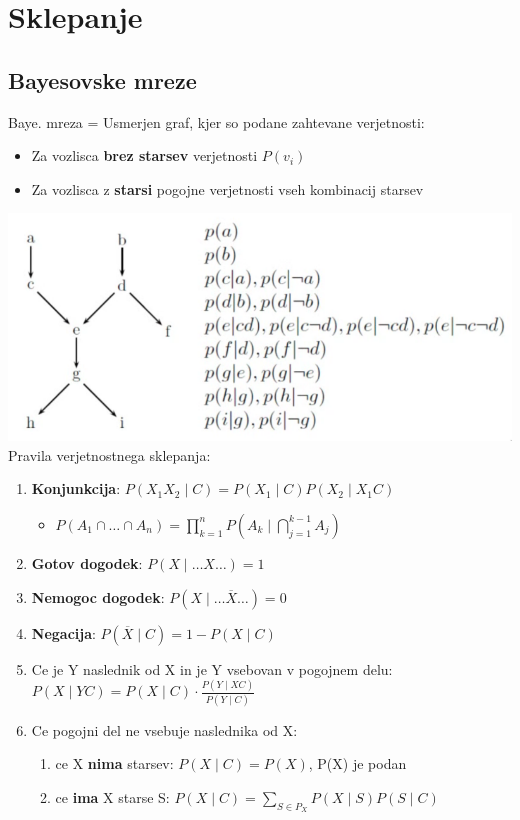 \section{Sklepanje}
\subsection{Bayesovske mreze}
Baye. mreza = Usmerjen graf, kjer so podane zahtevane verjetnosti:
\begin{itemize}[leftmargin=*,topsep=0pt,noitemsep]
    \item Za vozlisca \textbf{brez starsev} verjetnosti $P(v_i)$
    \item Za vozlisca z \textbf{starsi} pogojne verjetnosti vseh kombinacij starsev
\end{itemize}
\includegraphics[width=\columnwidth]{images/bayesovska_mreza.png}
Pravila verjetnostnega sklepanja:
\begin{enumerate}[leftmargin=*,topsep=0pt,noitemsep]
    \item \textbf{Konjunkcija}: $P(X_1 X_2 \mid C) = P(X_1 \mid C) P(X_2 \mid X_1C)$
        \begin{itemize}[leftmargin=*,topsep=0pt,noitemsep]
            \item $P(A_1\cap\dots\cap A_n) = \prod\limits_{k=1}^n P\left(A_k\mid \bigcap\limits_{j=1}^{k-1} A_j\right)$ 
        \end{itemize} 
    \item \textbf{Gotov dogodek}: $P(X \mid \dots X \dots) = 1$
    \item \textbf{Nemogoc dogodek}: $P(X\mid \dots \overline{X} \dots) = 0$
    \item \textbf{Negacija}: $P(\overline{X} \mid C) = 1 - P(X \mid C)$
    \item Ce je Y naslednik od X in je Y vsebovan v pogojnem delu:\\
        $P(X\mid YC) = P(X\mid C) \cdot \frac{P(Y\mid XC)}{P(Y\mid C)}$
    \item Ce pogojni del ne vsebuje naslednika od X:
        \begin{enumerate}[leftmargin=0.1cm,noitemsep,topsep=0pt,label=(\alph*)]
            \item ce X \textbf{nima} starsev: $P(X\mid C) = P(X)$, P(X) je podan
            \item ce \textbf{ima} X starse S: $P(X\mid C) = \sum_{S\in P_X} P(X \mid S)P(S\mid C)$
        \end{enumerate}
\end{enumerate}
